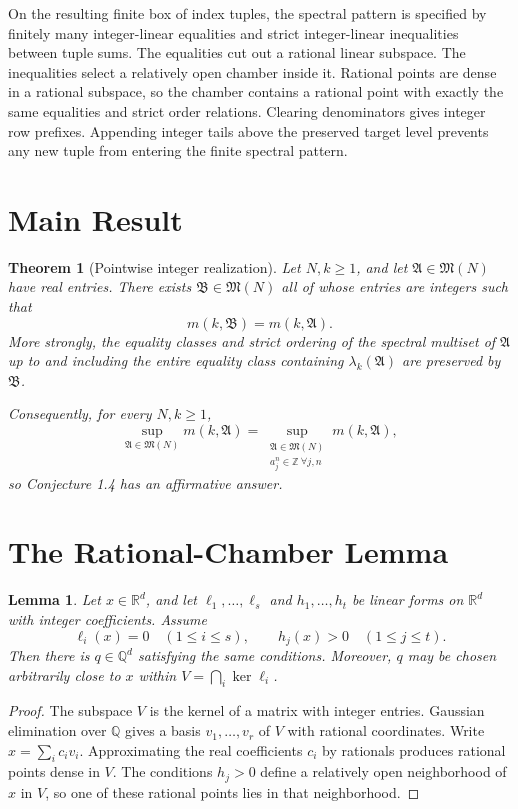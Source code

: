 \documentclass[11pt]{article}
\newtheorem{theorem}{Theorem}
\newtheorem{lemma}{Lemma}
\newcommand{\R}{\mathbb R}
\newcommand{\Q}{\mathbb Q}
\newcommand{\Z}{\mathbb Z}
\newcommand{\Acal}{\mathfrak A}
\newcommand{\Mcal}{\mathfrak M}
\begin{document}
On the resulting finite box of index tuples, the spectral pattern is
specified by finitely many integer-linear equalities and strict
integer-linear inequalities between tuple sums.
The equalities cut out a rational linear subspace.  The inequalities select
a relatively open chamber inside it.  Rational points are dense in a
rational subspace, so the chamber contains a rational point with exactly the
same equalities and strict order relations.  Clearing denominators gives
integer row prefixes.  Appending integer tails above the preserved target
level prevents any new tuple from entering the finite spectral pattern.

\section*{Main Result}

\begin{theorem}[Pointwise integer realization]\label{thm:main}
Let $N,k\geq1$, and let $\Acal\in\Mcal(N)$ have real entries.  There exists
$\mathfrak B\in\Mcal(N)$ all of whose entries are integers such that
\[
                         m(k,\mathfrak B)=m(k,\Acal).
\]
More strongly, the equality classes and strict ordering of the spectral
multiset of $\Acal$ up to and including the entire equality class containing
$\lambda_k(\Acal)$ are preserved by $\mathfrak B$.

Consequently, for every $N,k\geq1$,
\[
 \sup_{\Acal\in\Mcal(N)}m(k,\Acal)
 =\sup_{\substack{\Acal\in\Mcal(N)\\a_j^n\in\Z\ \forall j,n}}
       m(k,\Acal),
\]
so Conjecture 1.4 has an affirmative answer.
\end{theorem}

\section*{The Rational-Chamber Lemma}

\begin{lemma}\label{lem:chamber}
Let $x\in\R^d$, and let $\ell_1,\ldots,\ell_s$ and
$h_1,\ldots,h_t$ be linear forms on $\R^d$ with integer coefficients.
Assume
\[
                  \ell_i(x)=0\quad(1\leq i\leq s),
                  \qquad h_j(x)>0\quad(1\leq j\leq t).
\]
Then there is $q\in\Q^d$ satisfying the same conditions.
Moreover, $q$ may be chosen arbitrarily close to $x$ within
$V=\bigcap_i\ker\ell_i$.
\end{lemma}

\begin{proof}
The subspace $V$ is the kernel of a matrix with integer entries.  Gaussian
elimination over $\Q$ gives a basis $v_1,\ldots,v_r$ of $V$ with rational
coordinates.  Write $x=\sum_i c_iv_i$.  Approximating the real coefficients
$c_i$ by rationals produces rational points dense in $V$.  The conditions
$h_j>0$ define a relatively open neighborhood of $x$ in $V$, so one of
these rational points lies in that neighborhood.
\end{proof}
\end{document}
